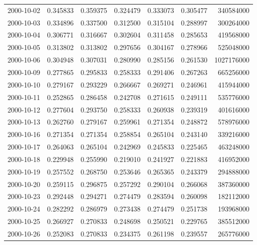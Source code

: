 \begin{tabular}{lrrrrrr}
2000-10-02 &    0.345833 &    0.359375 &    0.324479 &    0.333073 &    0.305477 &   340584000 \\
2000-10-03 &    0.334896 &    0.337500 &    0.312500 &    0.315104 &    0.288997 &   300264000 \\
2000-10-04 &    0.306771 &    0.316667 &    0.302604 &    0.311458 &    0.285653 &   419568000 \\
2000-10-05 &    0.313802 &    0.313802 &    0.297656 &    0.304167 &    0.278966 &   525048000 \\
2000-10-06 &    0.304948 &    0.307031 &    0.280990 &    0.285156 &    0.261530 &  1027176000 \\
2000-10-09 &    0.277865 &    0.295833 &    0.258333 &    0.291406 &    0.267263 &   665256000 \\
2000-10-10 &    0.279167 &    0.293229 &    0.266667 &    0.269271 &    0.246961 &   415944000 \\
2000-10-11 &    0.252865 &    0.286458 &    0.242708 &    0.271615 &    0.249111 &   535776000 \\
2000-10-12 &    0.277604 &    0.293750 &    0.258333 &    0.260938 &    0.239319 &   401616000 \\
2000-10-13 &    0.262760 &    0.279167 &    0.259961 &    0.271354 &    0.248872 &   578976000 \\
2000-10-16 &    0.271354 &    0.271354 &    0.258854 &    0.265104 &    0.243140 &   339216000 \\
2000-10-17 &    0.264063 &    0.265104 &    0.242969 &    0.245833 &    0.225465 &   463248000 \\
2000-10-18 &    0.229948 &    0.255990 &    0.219010 &    0.241927 &    0.221883 &   416952000 \\
2000-10-19 &    0.257552 &    0.268750 &    0.253646 &    0.265365 &    0.243379 &   294888000 \\
2000-10-20 &    0.259115 &    0.296875 &    0.257292 &    0.290104 &    0.266068 &   387360000 \\
2000-10-23 &    0.292448 &    0.294271 &    0.274479 &    0.283594 &    0.260098 &   182112000 \\
2000-10-24 &    0.282292 &    0.286979 &    0.273438 &    0.274479 &    0.251738 &   193968000 \\
2000-10-25 &    0.266927 &    0.270833 &    0.248698 &    0.250521 &    0.229765 &   385512000 \\
2000-10-26 &    0.252083 &    0.270833 &    0.234375 &    0.261198 &    0.239557 &   265776000 \\

\end{tabular}

